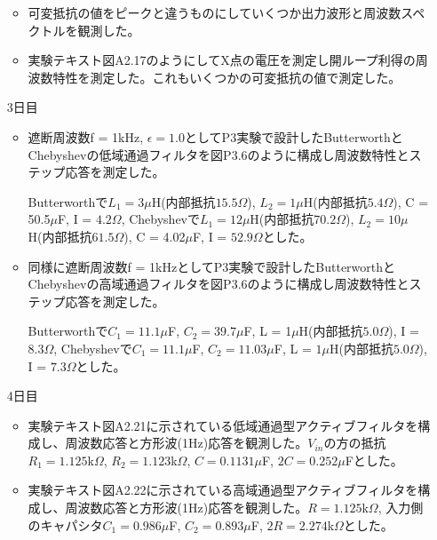 \documentclass[dvipdfmx, twocolumn]{jsarticle}
\begin{document}
\begin{enumerate}
\begin{itemize}
\item 可変抵抗の値をピークと違うものにしていくつか出力波形と周波数スペクトルを観測した。

\item 実験テキスト図A2.17のようにしてX点の電圧を測定し開ループ利得の周波数特性を測定した。これもいくつかの可変抵抗の値で測定した。

\end{itemize}

\item[3日目]

\begin{itemize}

\item 遮断周波数f = 1kHz, $\epsilon = 1.0$としてP3実験で設計したButterworthとChebyshevの低域通過フィルタを図P3.6のように構成し周波数特性とステップ応答を測定した。

Butterworthで$L_{1} = 3\mu$H(内部抵抗$15.5\Omega$), $L_{2} = 1\mu$H(内部抵抗$5.4\Omega$), C = 50.5$\mu$F, I = $4.2\Omega$, Chebyshevで$L_{1} = 12\mu$H(内部抵抗$70.2\Omega$), $L_{2} = 10\mu$H(内部抵抗$61.5\Omega$), C = 4.02$\mu$F, I = $52.9\Omega$とした。

\item 同様に遮断周波数f = 1kHzとしてP3実験で設計したButterworthとChebyshevの高域通過フィルタを図P3.6のように構成し周波数特性とステップ応答を測定した。

Butterworthで$C_{1} = 11.1\mu$F, $C_{2} = 39.7\mu$F, L = 1$\mu$H(内部抵抗$5.0\Omega$), I = $8.3\Omega$, Chebyshevで$C_{1} = 11.1\mu$F, $C_{2} = 11.03\mu$F, L = $1\mu$H(内部抵抗$5.0\Omega$), I = $7.3\Omega$とした。


\end{itemize}

\item[4日目]
\begin{itemize}

\item 実験テキスト図A2.21に示されている低域通過型アクティブフィルタを構成し、周波数応答と方形波(1Hz)応答を観測した。$V_{in}$の方の抵抗$R_{1} = 1.125$k$\Omega$, $R_{2} = 1.123$k$\Omega$, $C = 0.1131\mu$F, $2C = 0.252\mu$Fとした。

\item 実験テキスト図A2.22に示されている高域通過型アクティブフィルタを構成し、周波数応答と方形波(1Hz)応答を観測した。$R = 1.125$k$\Omega$, 入力側のキャパシタ$C_{1} = 0.986\mu$F, $C_{2} = 0.893\mu$F, $2R = 2.274$k$\Omega$とした。

\end{itemize}
\end{enumerate}
\end{document}
